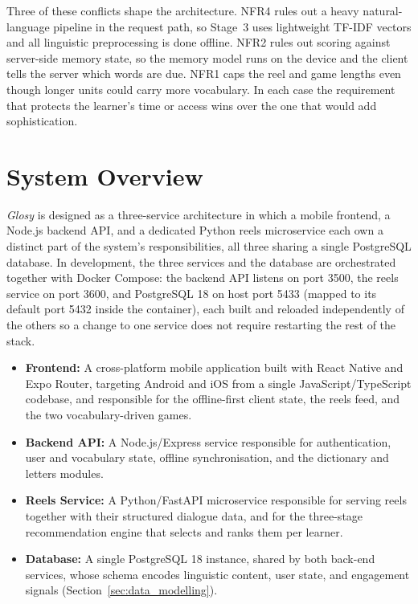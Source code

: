     Three of these conflicts shape the architecture. NFR4 rules out a heavy natural-language pipeline in the request path, so Stage~3 uses lightweight TF-IDF vectors and all linguistic preprocessing is done offline. NFR2 rules out scoring against server-side memory state, so the memory model runs on the device and the client tells the server which words are due. NFR1 caps the reel and game lengths even though longer units could carry more vocabulary. In each case the requirement that protects the learner's time or access wins over the one that would add sophistication.
\flushbottom


\section{System Overview}
\label{sec:system_overview}

    \textit{Glosy} is designed as a three-service architecture in which a mobile frontend, a Node.js backend API, and a dedicated Python reels microservice each own a distinct part of the system's responsibilities, all three sharing a single PostgreSQL database. In development, the three services and the database are orchestrated together with Docker Compose: the backend API listens on port 3500, the reels service on port 3600, and PostgreSQL 18 on host port 5433 (mapped to its default port 5432 inside the container), each built and reloaded independently of the others so a change to one service does not require restarting the rest of the stack.

    \begin{itemize}
        \item \textbf{Frontend:} A cross-platform mobile application built with React Native and Expo Router, targeting Android and iOS from a single JavaScript/TypeScript codebase, and responsible for the offline-first client state, the reels feed, and the two vocabulary-driven games.
        \item \textbf{Backend API:} A Node.js/Express service responsible for authentication, user and vocabulary state, offline synchronisation, and the dictionary and letters modules.
        \item \textbf{Reels Service:} A Python/FastAPI microservice responsible for serving reels together with their structured dialogue data, and for the three-stage recommendation engine that selects and ranks them per learner.
        \item \textbf{Database:} A single PostgreSQL 18 instance, shared by both back-end services, whose schema encodes linguistic content, user state, and engagement signals (Section~\ref{sec:data_modelling}).
    \end{itemize}

